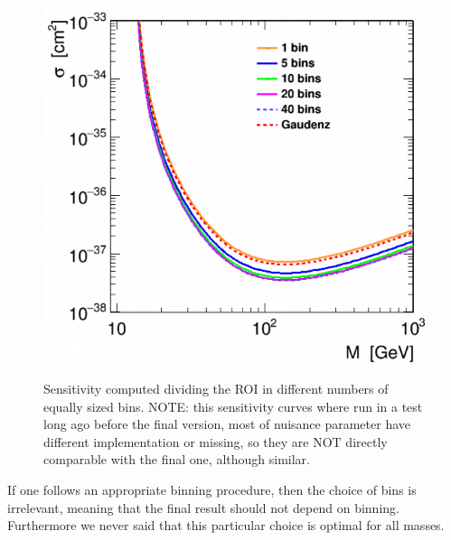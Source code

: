 \documentclass{article}
\begin{document}
\begin{figure}[t!]
  \centerline{\includegraphics[width=0.7\linewidth]{inelastic_binning_check.png}}
  \caption{ Sensitivity computed dividing the ROI in different numbers of equally sized bins. NOTE: this sensitivity curves where run in a test long ago before the final version, most of nuisance parameter have different implementation or missing, so they are NOT directly comparable with the final one, although similar.}
  \label{fig:binning}
\end{figure}

If one follows an appropriate binning procedure, then the choice of bins is irrelevant, meaning that 
the final result should not depend on binning. Furthermore we never said that this particular 
choice is optimal for all masses.
\end{document}
